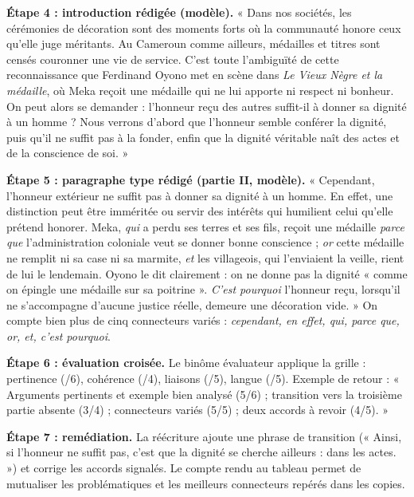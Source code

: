 \documentclass[11pt]{article}
\newcounter{popsec}
\newcounter{popsub}
\newcommand{\courssub}[1]{%
  \stepcounter{popsub}%
  \par\vspace{9pt}\noindent{\popxbold\fontsize{11.5}{13}\selectfont\color{popink}{\color{poporange}\thepopsec.\thepopsub}\hspace{6pt}#1}\par\nopagebreak\vspace{4pt}
}
\begin{document}
\begin{exoresolu}
\textbf{Étape 4 : introduction rédigée (modèle).} « Dans nos sociétés, les cérémonies de décoration sont des moments forts où la communauté honore ceux qu'elle juge méritants. Au Cameroun comme ailleurs, médailles et titres sont censés couronner une vie de service. C'est toute l'ambiguïté de cette reconnaissance que Ferdinand Oyono met en scène dans \emph{Le Vieux Nègre et la médaille}, où Meka reçoit une médaille qui ne lui apporte ni respect ni bonheur. On peut alors se demander : l'honneur reçu des autres suffit-il à donner sa dignité à un homme ? Nous verrons d'abord que l'honneur semble conférer la dignité, puis qu'il ne suffit pas à la fonder, enfin que la dignité véritable naît des actes et de la conscience de soi. »

\textbf{Étape 5 : paragraphe type rédigé (partie II, modèle).} « Cependant, l'honneur extérieur ne suffit pas à donner sa dignité à un homme. En effet, une distinction peut être imméritée ou servir des intérêts qui humilient celui qu'elle prétend honorer. Meka, \emph{qui} a perdu ses terres et ses fils, reçoit une médaille \emph{parce que} l'administration coloniale veut se donner bonne conscience ; \emph{or} cette médaille ne remplit ni sa case ni sa marmite, \emph{et} les villageois, qui l'enviaient la veille, rient de lui le lendemain. Oyono le dit clairement : on ne donne pas la dignité « comme on épingle une médaille sur sa poitrine ». \emph{C'est pourquoi} l'honneur reçu, lorsqu'il ne s'accompagne d'aucune justice réelle, demeure une décoration vide. » On compte bien plus de cinq connecteurs variés : \emph{cependant, en effet, qui, parce que, or, et, c'est pourquoi}.

\textbf{Étape 6 : évaluation croisée.} Le binôme évaluateur applique la grille : pertinence (/6), cohérence (/4), liaisons (/5), langue (/5). Exemple de retour : « Arguments pertinents et exemple bien analysé (5/6) ; transition vers la troisième partie absente (3/4) ; connecteurs variés (5/5) ; deux accords à revoir (4/5). »

\textbf{Étape 7 : remédiation.} La réécriture ajoute une phrase de transition (« Ainsi, si l'honneur ne suffit pas, c'est que la dignité se cherche ailleurs : dans les actes. ») et corrige les accords signalés. Le compte rendu au tableau permet de mutualiser les problématiques et les meilleurs connecteurs repérés dans les copies.
\end{exoresolu}

\courssub{Bilan de l'activité}
\end{document}
